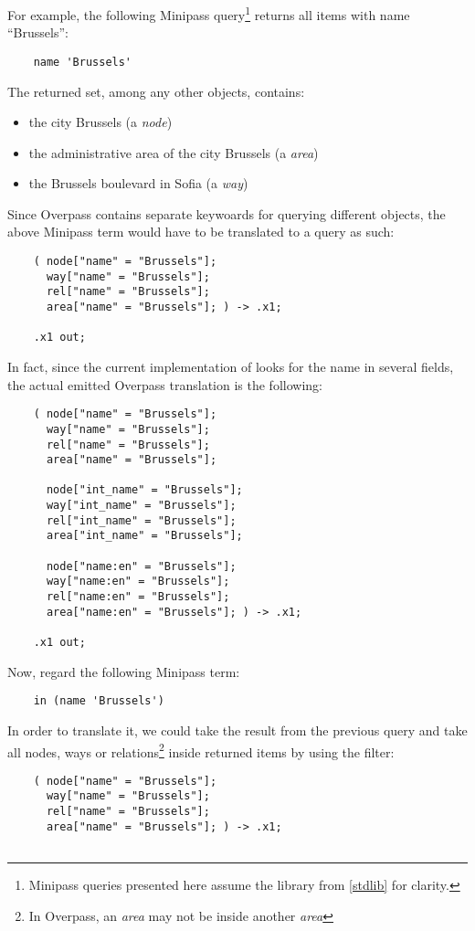 \documentclass[main.tex]{subfiles}
\begin{document}
\begin{example}
For example, the following Minipass
query\footnote{
    Minipass queries presented here assume the library from \cref{stdlib}
    for clarity.
} returns all items with name ``Brussels'':
\begin{lstlisting}
    name 'Brussels'
\end{lstlisting}
The returned set, among any other objects, contains:
\begin{itemize}
    \item the city Brussels (a \emph{node})
    \item the administrative area of the city Brussels (a \emph{area})
    \item the Brussels boulevard in Sofia (a \emph{way})
\end{itemize}
Since Overpass contains separate keywoards for querying different objects,
the above Minipass term would have to be translated to a query as such:
\begin{lstlisting}
    ( node["name" = "Brussels"];
      way["name" = "Brussels"];
      rel["name" = "Brussels"];
      area["name" = "Brussels"]; ) -> .x1;

    .x1 out;
\end{lstlisting}
In fact, since the current implementation of  looks for the
name in several fields, the actual emitted Overpass translation is the
following:
\begin{lstlisting}
    ( node["name" = "Brussels"];
      way["name" = "Brussels"];
      rel["name" = "Brussels"];
      area["name" = "Brussels"];

      node["int_name" = "Brussels"];
      way["int_name" = "Brussels"];
      rel["int_name" = "Brussels"];
      area["int_name" = "Brussels"];

      node["name:en" = "Brussels"];
      way["name:en" = "Brussels"];
      rel["name:en" = "Brussels"];
      area["name:en" = "Brussels"]; ) -> .x1;

    .x1 out;
\end{lstlisting}

Now, regard the following Minipass term:
\begin{lstlisting}
    in (name 'Brussels')
\end{lstlisting}
In order to translate it, we could take the result from the previous query
and take all nodes, ways or relations\footnote{In Overpass, an \emph{area} may
    not be inside another \emph{area}} inside returned items by using the
 filter:
\begin{lstlisting}
    ( node["name" = "Brussels"];
      way["name" = "Brussels"];
      rel["name" = "Brussels"];
      area["name" = "Brussels"]; ) -> .x1;


\end{lstlisting}
\end{example}
\end{document}
